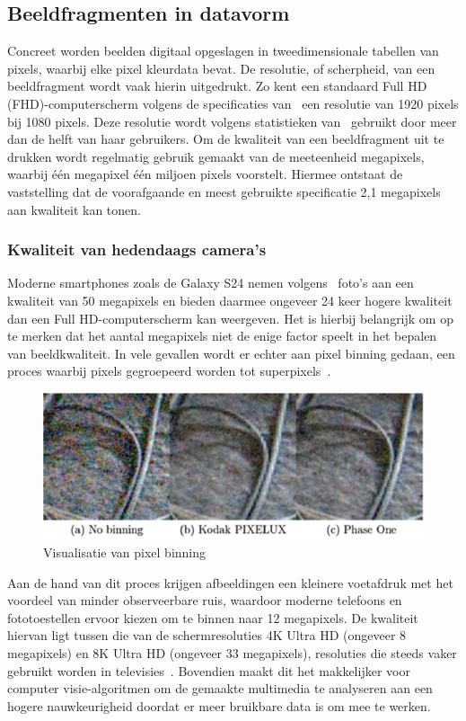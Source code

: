 \subsection{Beeldfragmenten in datavorm}\label{subsec:beeldfragmenten-als-data}
Concreet worden beelden digitaal opgeslagen in tweedimensionale tabellen van pixels, waarbij elke pixel kleurdata bevat.
De resolutie, of scherpheid, van een beeldfragment wordt vaak hierin uitgedrukt.
Zo kent een standaard Full HD (FHD)-computerscherm volgens de specificaties van~\textcite{VESA2013} een resolutie van 1920 pixels bij 1080 pixels.
Deze resolutie wordt volgens statistieken van~\textcite{ValveCorporation2024} gebruikt door meer dan de helft van haar gebruikers.
Om de kwaliteit van een beeldfragment uit te drukken wordt regelmatig gebruik gemaakt van de meeteenheid megapixels, waarbij \'e\'en megapixel \'e\'en miljoen pixels voorstelt.
Hiermee ontstaat de vaststelling dat de voorafgaande en meest gebruikte specificatie 2,1 megapixels aan kwaliteit kan tonen.

\subsubsection{Kwaliteit van hedendaags camera's}
Moderne smartphones zoals de Galaxy S24 nemen volgens~\textcite{Samsung2024} foto's aan een kwaliteit van 50 megapixels en bieden daarmee ongeveer 24 keer hogere kwaliteit dan een Full HD-computerscherm kan weergeven.
Het is hierbij belangrijk om op te merken dat het aantal megapixels niet de enige factor speelt in het bepalen van beeldkwaliteit.
In vele gevallen wordt er echter aan pixel binning gedaan, een proces waarbij pixels gegroepeerd worden tot superpixels~\autocite{Jin2012}.
\begin{figure}
    \includegraphics[width=1\linewidth]{images/pixel-binning}
    \caption{Visualisatie van pixel binning~\autocite{Jin2012}}
    \label{fig:pixel-binning}
\end{figure}
Aan de hand van dit proces krijgen afbeeldingen een kleinere voetafdruk met het voordeel van minder observeerbare ruis, waardoor moderne telefoons en fototoestellen ervoor kiezen om te binnen naar 12 megapixels.
De kwaliteit hiervan ligt tussen die van de schermresoluties 4K Ultra HD (ongeveer 8 megapixels) en 8K Ultra HD (ongeveer 33 megapixels), resoluties die steeds vaker gebruikt worden in televisies~\autocite{Statista2024}.
Bovendien maakt dit het makkelijker voor computer visie-algoritmen om de gemaakte multimedia te analyseren aan een hogere nauwkeurigheid doordat er meer bruikbare data is om mee te werken.

